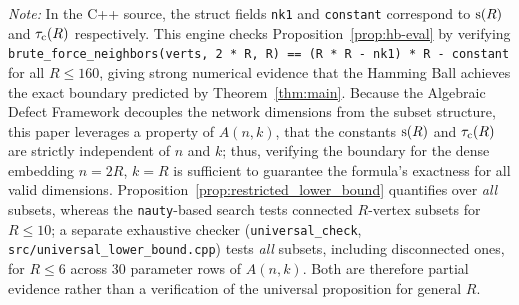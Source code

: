 \noindent \emph{Note:} In the C++ source, the struct fields \texttt{nk1} and
\texttt{constant} correspond to $\mathrm{s}(R)$ and $\tau_{\mathrm{c}}(R)$ respectively. This
engine checks Proposition~\ref{prop:hb-eval} by verifying \\
\texttt{brute\_force\_neighbors(verts, 2 * R, R) == (R * R - nk1) * R -
constant} \\ for all $R \le 160$, giving strong numerical evidence that the
Hamming Ball achieves the exact boundary predicted by Theorem~\ref{thm:main}.
Because the Algebraic Defect Framework decouples the network dimensions from the
subset structure, this paper leverages a property of $A(n,k)$, that the
constants $\mathrm{s}(R)$ and $\tau_{\mathrm{c}}(R)$ are strictly independent of $n$ and $k$;
thus, verifying the boundary for the dense embedding $n=2R$, $k=R$ is sufficient
to guarantee the formula's exactness for all valid dimensions.
Proposition~\ref{prop:restricted_lower_bound} quantifies over \emph{all} subsets, whereas
the \texttt{nauty}-based search tests connected $R$-vertex subsets for
$R \le 10$; a separate exhaustive checker (\texttt{universal\_check},
\texttt{src/universal\_lower\_bound.cpp}) tests \emph{all} subsets, including
disconnected ones, for $R \le 6$ across 30 parameter rows of $A(n,k)$. Both
are therefore partial evidence rather than a verification of the universal
proposition for general $R$.
